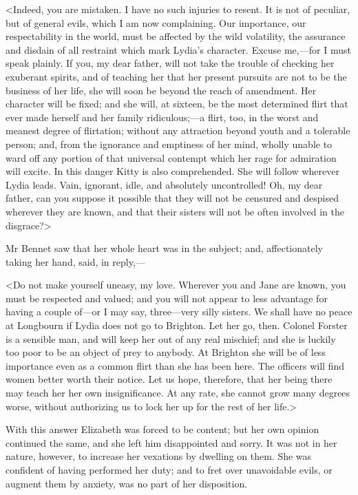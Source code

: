 <Indeed, you are mistaken. I have no such injuries to resent. It is not of peculiar, but of general evils, which I am now complaining. Our importance, our respectability in the world, must be affected by the wild volatility, the assurance and disdain of all restraint which mark Lydia's character. Excuse me,—for I must speak plainly. If you, my dear father, will not take the trouble of checking her exuberant spirits, and of teaching her that her present pursuits are not to be the business of her life, she will soon be beyond the reach of amendment. Her character will be fixed; and she will, at sixteen, be the most determined flirt that ever made herself and her family ridiculous;—a flirt, too, in the worst and meanest degree of flirtation; without any attraction beyond youth and a tolerable person; and, from the ignorance and emptiness of her mind, wholly unable to ward off any portion of that universal contempt which her rage for admiration will excite. In this danger Kitty is also comprehended. She will follow wherever Lydia leads. Vain, ignorant, idle, and absolutely uncontrolled! Oh, my dear father, can you suppose it possible that they will not be censured and despised wherever they are known, and that their sisters will not be often involved in the disgrace?>

Mr Bennet saw that her whole heart was in the subject; and, affectionately taking her hand, said, in reply,—

<Do not make yourself uneasy, my love. Wherever you and Jane are known, you must be respected and valued; and you will not appear to less advantage for having a couple of—or I may say, three—very silly sisters. We shall have no peace at Longbourn if Lydia does not go to Brighton. Let her go, then. Colonel Forster is a sensible man, and will keep her out of any real mischief; and she is luckily too poor to be an object of prey to anybody. At Brighton she will be of less importance even as a common flirt than she has been here. The officers will find women better worth their notice. Let us hope, therefore, that her being there may teach her her own insignificance. At any rate, she cannot grow many degrees worse, without authorizing us to lock her up for the rest of her life.>

With this answer Elizabeth was forced to be content; but her own opinion continued the same, and she left him disappointed and sorry. It was not in her nature, however, to increase her vexations by dwelling on them. She was confident of having performed her duty; and to fret over unavoidable evils, or augment them by anxiety, was no part of her disposition.

